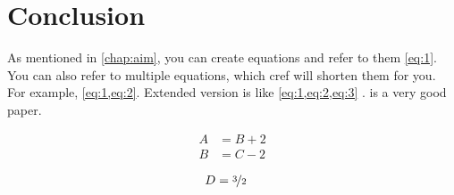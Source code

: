 \chapter{Conclusion} \label{chap:conclusion}

As mentioned in \cref{chap:aim}, you can create equations and refer to them \cref{eq:1}. You can also refer to multiple equations, which cref will shorten them for you. For example, \cref{eq:1,eq:2}. Extended version is like \cref{eq:1,eq:2,eq:3} \citep{Shoorangiz2016}. \cite{Baseer2017} is a very good paper.


\begin{align}
	A & = B + 2 \label{eq:1}\\
	B & = C - 2 \label{eq:2}
\end{align}

\begin{align}
	D & = \nicefrac{3}{2} \label{eq:3}
\end{align}